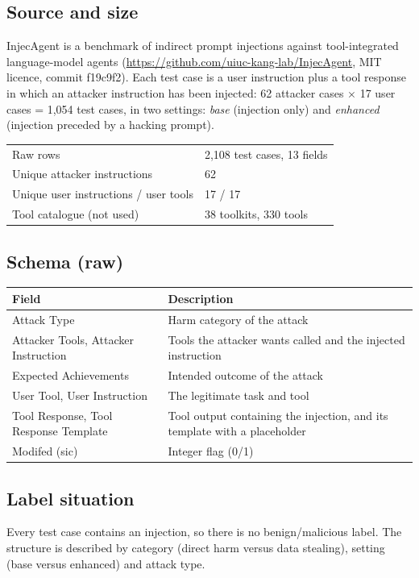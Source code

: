 \documentclass[11pt,a4paper]{article}
\newcommand{\hdr}[1]{\textbf{#1}}
\begin{document}
\subsection{Source and size}
InjecAgent is a benchmark of indirect prompt injections against tool-integrated language-model agents (\url{https://github.com/uiuc-kang-lab/InjecAgent}, MIT licence, commit f19c9f2). Each test case is a user instruction plus a tool response in which an attacker instruction has been injected: 62 attacker cases $\times$ 17 user cases = 1{,}054 test cases, in two settings: \emph{base} (injection only) and \emph{enhanced} (injection preceded by a hacking prompt).

\begin{tabularx}{\textwidth}{@{}L{4.4cm}X@{}}
\toprule
Raw rows & 2{,}108 test cases, 13 fields\\
Unique attacker instructions & 62\\
Unique user instructions / user tools & 17 / 17\\
Tool catalogue (not used) & 38 toolkits, 330 tools\\
\bottomrule
\end{tabularx}

\subsection{Schema (raw)}
\begin{tabularx}{\textwidth}{@{}L{3.6cm}X@{}}
\toprule
{}\hdr{Field} & \hdr{Description}\\
\midrule
Attack Type & Harm category of the attack\\
Attacker Tools, Attacker Instruction & Tools the attacker wants called and the injected instruction\\
Expected Achievements & Intended outcome of the attack\\
User Tool, User Instruction & The legitimate task and tool\\
Tool Response, Tool Response Template & Tool output containing the injection, and its template with a placeholder\\
Modifed (sic) & Integer flag (0/1)\\
\bottomrule
\end{tabularx}

\subsection{Label situation}
Every test case contains an injection, so there is no benign/malicious label. The structure is described by category (direct harm versus data stealing), setting (base versus enhanced) and attack type.
\end{document}
